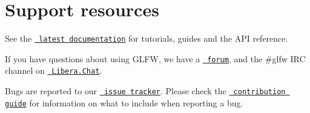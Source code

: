 \chapter{Support resources}
\hypertarget{md__c_1_2_users_2_fahad_2_one_drive_01-_01_seneca_2_seneca_2_sem__5_2_s_e_d500-_introduction_01t864e2ecff358bc91d348289f6445727d}{}\label{md__c_1_2_users_2_fahad_2_one_drive_01-_01_seneca_2_seneca_2_sem__5_2_s_e_d500-_introduction_01t864e2ecff358bc91d348289f6445727d}
\label{md__c_1_2_users_2_fahad_2_one_drive_01-_01_seneca_2_seneca_2_sem__5_2_s_e_d500-_introduction_01t864e2ecff358bc91d348289f6445727d_autotoc_md29}%
%
 See the \href{https://www.glfw.org/docs/latest/}{\texttt{ latest documentation}} for tutorials, guides and the API reference.

If you have questions about using GLFW, we have a \href{https://discourse.glfw.org/}{\texttt{ forum}}, and the {\ttfamily \#glfw} IRC channel on \href{https://libera.chat/}{\texttt{ Libera.\+Chat}}.

Bugs are reported to our \href{https://github.com/glfw/glfw/issues}{\texttt{ issue tracker}}. Please check the \href{https://github.com/glfw/glfw/blob/master/docs/CONTRIBUTING.md}{\texttt{ contribution guide}} for information on what to include when reporting a bug. 